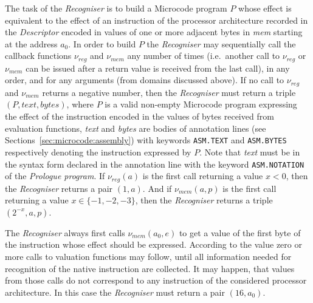 \documentclass[10pt,twocolumn]{article}
\begin{document}
The task of the \emph{Recogniser} is to build a Microcode program $ P $ whose
effect is equivalent to the effect of an instruction of the processor
architecture recorded in the \emph{Descriptor} encoded in values of one or more
adjacent bytes in \textit{mem} starting at the address $ a_0 $. In order to
build $ P $ the \emph{Recogniser} may sequentially call the callback functions $
\nu_\mathit{reg} $ and $ \nu_\mathit{mem} $ any number of times (i.e.~another
call to $ \nu_\mathit{reg} $ or $ \nu_\mathit{mem} $ can be issued after a
return value is received from the last call), in any order, and for any
arguments (from domains discussed above). If no call to $ \nu_\mathit{reg} $ and
$ \nu_\mathit{mem} $ returns a negative number, then the \emph{Recogniser} must
return a triple $ (P,\textit{text},\textit{bytes}) $, where $ P $ is a valid
non-empty Microcode program expressing the effect of the instruction encoded in
the values of bytes received from evaluation functions, \textit{text} and
\textit{bytes} are bodies of annotation lines (see
Sections~\ref{sec:microcode:assembly}) with keywords \texttt{ASM.TEXT} and
\texttt{ASM.BYTES} respectively denoting the instruction expressed by $ P $.
Note that \textit{text} must be in the syntax form declared in the annotation
line with the keyword \texttt{ASM.NOTATION} of the \emph{Prologue program}. If $
\nu_\mathit{reg}(a) $ is the first call returning a value $ x < 0 $, then the
\emph{Recogniser} returns a pair $ (1,a) $. And if $ \nu_\mathit{mem}(a,p) $ is
the first call returning a value $ x \in \{-1,-2,-3\} $, then the \emph{Recogniser}
returns a triple $ (2^{-x},a,p) $.


The \emph{Recogniser} always first calls $ \nu_\mathit{mem}(a_0,e) $ to get a
value of the first byte of the instruction whose effect should be expressed.
According to the value zero or more calls to valuation functions may follow,
until all information needed for recognition of the native instruction are
collected. It may happen, that values from those calls do not correspond to any
instruction of the considered processor architecture. In this case the \emph{Recogniser} must return a pair $ (16,a_0) $.
\end{document}
